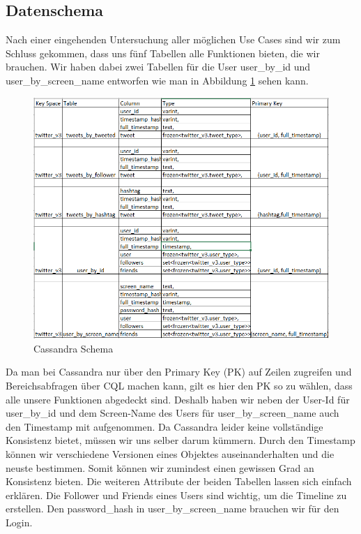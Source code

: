 \subsection{Datenschema}
\label{subsec:schema}
Nach einer eingehenden Untersuchung aller möglichen Use Cases sind wir zum Schluss gekommen, dass uns fünf Tabellen alle Funktionen bieten, die wir brauchen. Wir haben dabei zwei Tabellen für die User user\_by\_id und user\_by\_screen\_name entworfen wie man in Abbildung \ref{fig:schema} sehen kann.
\begin{figure}[htbp!]
	\centering
	\includegraphics[scale=0.725]{pics/schema.PNG}
	\caption{Cassandra Schema}
	\label{fig:schema}
\end{figure}
Da man bei Cassandra nur über den Primary Key (PK) auf Zeilen zugreifen und Bereichsabfragen über CQL machen kann, gilt es hier den PK so zu wählen, dass alle unsere Funktionen abgedeckt sind. Deshalb haben wir neben der User-Id für user\_by\_id und dem Screen-Name des Users für user\_by\_screen\_name auch den Timestamp mit aufgenommen. Da Cassandra leider keine vollständige Konsistenz bietet, müssen wir uns selber darum kümmern. Durch den Timestamp können wir verschiedene Versionen eines Objektes auseinanderhalten und die neuste bestimmen. Somit können wir zumindest einen gewissen Grad an Konsistenz bieten. Die weiteren Attribute der beiden Tabellen lassen sich einfach erklären. Die Follower und Friends eines Users sind wichtig, um die Timeline zu erstellen. Den password\_hash in user\_by\_screen\_name brauchen wir für den Login.\\

